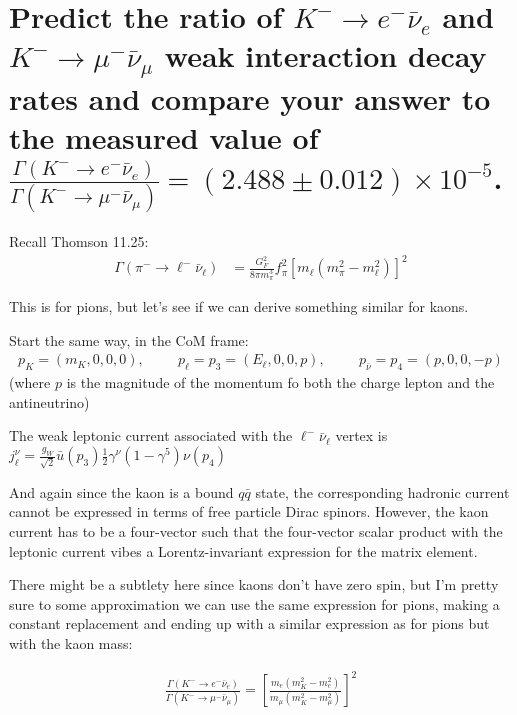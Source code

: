 \section{Predict the ratio of \texorpdfstring{$K^- \to e^- \bar{\nu}_e$}{K minus to e minus nu e} and \texorpdfstring{$K^- \to \mu^- \bar{\nu}_\mu$}{K minus to mu minus nu mu} weak interaction decay rates and compare your answer to the measured value of \texorpdfstring{$\frac{\Gamma(K^- \to e^- \bar{\nu}_e)}{\Gamma(K^- \to \mu^- \bar{\nu}_\mu)} = (2.488\pm 0.012) \times 10^{-5}$}{2.488e-5 +/- 0.012e-5}.}

Recall Thomson 11.25:
\begin{align*}
    \Gamma(\pi^- \to \ell^- \bar{\nu}_\ell) &= \frac{G_F^2}{8\pi m_\pi^3} f_\pi^2 \left[m_\ell (m_\pi^2 - m_\ell^2)\right]^2
\end{align*}

This is for pions, but let's see if we can derive something similar for kaons.

Start the same way, in the CoM frame:
\begin{align*}
    p_K = (m_K, 0, 0, 0), \hspace{1cm} p_\ell = p_3 = (E_\ell, 0, 0, p), \hspace{1cm} p_{\bar{\nu}} = p_4 = (p, 0, 0, -p)
\end{align*}
(where $p$ is the magnitude of the momentum fo both the charge lepton and the antineutrino)

The weak leptonic current associated with the $\ell^- \bar{\nu}_\ell$ vertex is
$j_\ell^\nu = \frac{g_W}{\sqrt{2}}\bar{u}(p_3) \frac{1}{2}\gamma^\nu (1 - \gamma^5) \nu(p_4) $

And again since the kaon is a bound $q\bar{q}$ state, the corresponding hadronic current cannot be expressed in terms of free particle Dirac spinors. However, the kaon current has to be a four-vector such that the four-vector scalar product with the leptonic current vibes a Lorentz-invariant expression for the matrix element.

There might be a subtlety here since kaons don't have zero spin, but I'm pretty sure to some approximation we can use the same expression for pions, making a constant replacement and ending up with a similar expression as for pions but with the kaon mass:

\begin{align*}
    \frac{\Gamma(K^- \to e^- \bar{\nu}_e)}{\Gamma(K^- \to \mu^- \bar{\nu}_\mu)} = \left[\frac{m_e(m_K^2-m_e^2)}{m_\mu(m_K^2-m_\mu^2)}\right]^2\\
\end{align*}

